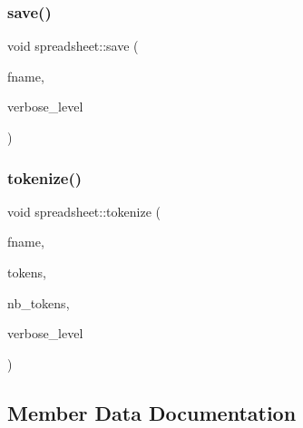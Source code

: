 \mbox{\label{classspreadsheet_ac8744dac17eef1474584aae9551927f6}} 
\subsubsection{\texorpdfstring{save()}{save()}}
{\footnotesize\ttfamily void spreadsheet\+::save (\begin{DoxyParamCaption}\item[{const \mbox{\hyperlink{galois_8h_ab6cc7b4aeb6ea31aba2b3fbfc83ff5e6}{B\+Y\+TE}} $\ast$}]{fname,  }\item[{\mbox{\hyperlink{galois_8h_a09fddde158a3a20bd2dcadb609de11dc}{I\+NT}}}]{verbose\+\_\+level }\end{DoxyParamCaption})}

\mbox{\label{classspreadsheet_a679506767b79d3d4b53b416fbcb79b1c}} 
\subsubsection{\texorpdfstring{tokenize()}{tokenize()}}
{\footnotesize\ttfamily void spreadsheet\+::tokenize (\begin{DoxyParamCaption}\item[{const \mbox{\hyperlink{galois_8h_ab6cc7b4aeb6ea31aba2b3fbfc83ff5e6}{B\+Y\+TE}} $\ast$}]{fname,  }\item[{\mbox{\hyperlink{galois_8h_ab6cc7b4aeb6ea31aba2b3fbfc83ff5e6}{B\+Y\+TE}} $\ast$$\ast$\&}]{tokens,  }\item[{\mbox{\hyperlink{galois_8h_a09fddde158a3a20bd2dcadb609de11dc}{I\+NT}} \&}]{nb\+\_\+tokens,  }\item[{\mbox{\hyperlink{galois_8h_a09fddde158a3a20bd2dcadb609de11dc}{I\+NT}}}]{verbose\+\_\+level }\end{DoxyParamCaption})}



\subsection{Member Data Documentation}
\mbox{\label{classspreadsheet_a40d427b8b590bd243db17fedddb7667e}} 
